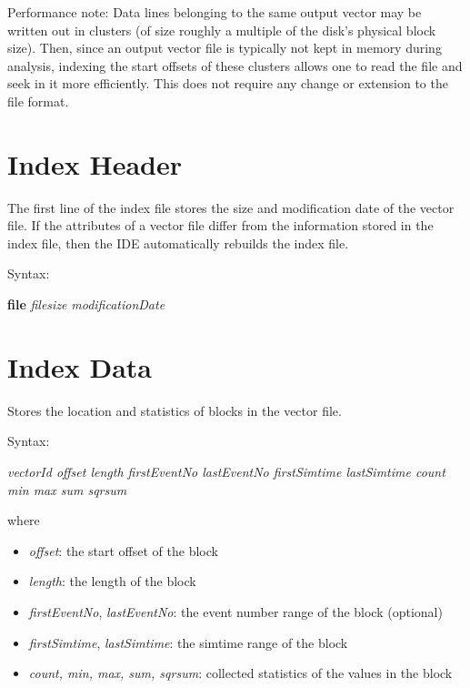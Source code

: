 Performance note: Data lines belonging to the same output vector may be
written out in clusters (of size roughly a multiple of the disk's
physical block size). Then, since an output vector file is typically
not kept in memory during analysis, indexing the start offsets of these
clusters allows one to read the file and seek in it more efficiently.
This does not require any change or extension to the file format.

\section{Index Header}
\label{sec:result-file-formats:index-header}

The first line of the index file stores the size and modification date
of the vector file. If the attributes of a vector file differ from
the information stored in the index file, then the IDE automatically
rebuilds the index file.

Syntax:

\hspace{20mm} \textbf{file} \textit{filesize} \textit{modificationDate}

\section{Index Data}
\label{sec:result-file-formats:index-data}

Stores the location and statistics of blocks in the vector file.

Syntax:

\hspace{20mm} {\textit{vectorId offset length firstEventNo lastEventNo
                       firstSimtime lastSimtime count min max sum sqrsum}}

where

\begin{itemize}
    \item\textit{offset}: the start offset of the block
    \item\textit{length}: the length of the block
    \item\textit{firstEventNo}, \textit{lastEventNo}:
        the event number range of the block (optional)
    \item\textit{firstSimtime}, \textit{lastSimtime}:
        the simtime range of the block
    \item\textit{count, min, max, sum, sqrsum}:
        collected statistics of the values in the block

\end{itemize}

